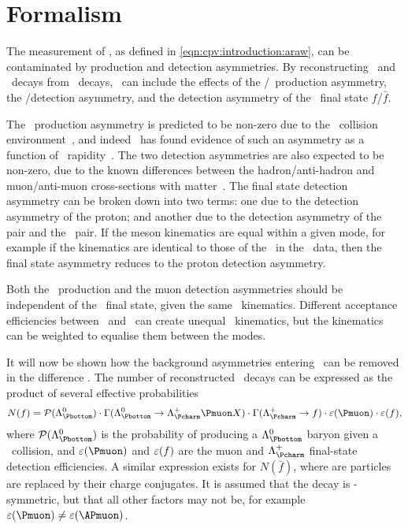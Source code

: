\chapter{Formalism}
\label{chap:cpv:theory}

The measurement of \ARaw, as defined in \cref{eqn:cpv:introduction:araw}, can 
be contaminated by production and detection asymmetries.
By reconstructing \LcTopKK\ and \LcToppipi\ decays from 
\ decays, \ARaw\ can include the effects of 
the \PLambdab/\APLambdab\ production asymmetry, the \Pmuon/\APmuon detection 
asymmetry, and the detection asymmetry of the \PLambdac\ final state 
$f$/$\bar{f}$.

The \PLambdab\ production asymmetry is predicted to be non-zero due to the \pp\ 
collision environment~\cite{PhysRevD.90.014023}, and indeed \lhcb\ has found 
evidence of such an asymmetry as a function of \PLambdab\ 
rapidity~\cite{Aaij:2015fea}.
The two detection asymmetries are also expected to be non-zero, due to the 
known differences between the hadron/anti-hadron and muon/anti-muon 
cross-sections with matter~\cite{PDG2014}.
The final state detection asymmetry can be broken down into two terms: one due 
to the detection asymmetry of the proton; and another due to the detection 
asymmetry of the \KmKp pair and the \pimpip\ pair.
If the meson kinematics are equal within a given mode, for example if the 
\PKminus kinematics are identical to those of the \PKplus\ in the \pKK\ data, 
then the final state asymmetry reduces to the proton detection asymmetry.

Both the \PLambdab\ production and the muon detection asymmetries should be 
independent of the \PLambdac\ final state, given the same \PLambdac\ 
kinematics.
Different acceptance efficiencies between \pKK\ and \ppipi\ can create unequal 
\PLambdac\ kinematics, but the kinematics can be weighted to equalise them 
between the modes.

It will now be shown how the background asymmetries entering \ARaw\ can be 
removed in the difference \dACP\@.
The number of reconstructed \LcTof\ decays can be expressed as the product of 
several effective probabilities
\begin{equation}
  N(f) = \prob(\PLambdab)\cdot
         \Gamma(\LbToLcmuX)\cdot
         \Gamma(\LcTof)\cdot
         \eff(\Pmuon)\cdot
         \eff(f),
  \label{eqn:cpv:theory:yield}
\end{equation}
where $\prob(\PLambdab)$ is the probability of producing a $\PLambdab$ baryon 
given a \pp\ collision, and $\eff(\Pmuon)$ and $\varepsilon(f)$ are the muon and 
$\PLambdac$ final-state detection efficiencies.
A similar expression exists for $N(\bar{f})$, where are particles are replaced 
by their charge conjugates.
It is assumed that the \LbToLcmuX decay is \CP-symmetric, but that all other 
factors may not be, for example $\eff(\Pmuon) \neq \eff(\APmuon)$.

